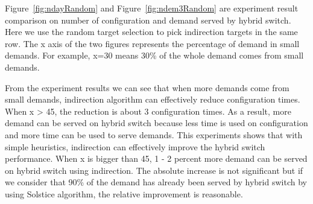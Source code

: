 Figure~\ref{fig:ndayRandom} and Figure~\ref{fig:ndem3Random} are experiment result comparison on number of configuration and demand served by hybrid switch. Here we use the random target selection to pick indirection targets in the same row. The x axis of the two figures represents the percentage of demand in small demands. For example, x=30 means 30\% of the whole demand comes from small demands.

From the experiment results we can see that when more demands come from small demands, indirection algorithm can effectively reduce configuration times. When x > 45, the reduction is about 3 configuration times. As a result, more demand can be served on hybrid switch because less time is used on configuration and more time can be used to serve demands. This experiments shows that with simple heuristics, indirection can effectively improve the hybrid switch performance. When x is bigger than 45, 1 - 2 percent more demand can be served on hybrid switch using indirection. The absolute increase is not significant but if we consider that 90\% of the demand has already been served by hybrid switch by using Solstice algorithm, the relative improvement is reasonable.

